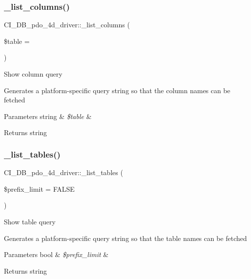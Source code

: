 \subsubsection{\texorpdfstring{\+\_\+list\+\_\+columns()}{\_list\_columns()}}
{\footnotesize\ttfamily C\+I\+\_\+\+D\+B\+\_\+pdo\+\_\+4d\+\_\+driver\+::\+\_\+list\+\_\+columns (\begin{DoxyParamCaption}\item[{}]{\$table = {\ttfamily \textquotesingle{}\textquotesingle{}} }\end{DoxyParamCaption})\hspace{0.3cm}{\ttfamily [protected]}}

Show column query

Generates a platform-\/specific query string so that the column names can be fetched


\begin{DoxyParams}[1]{Parameters}
string & {\em \$table} & \\
\hline
\end{DoxyParams}
\begin{DoxyReturn}{Returns}
string 
\end{DoxyReturn}
\mbox{\label{class_c_i___d_b__pdo__4d__driver_ad591ef8fff2b28c7c966d8cadd12ad5d}} 
\subsubsection{\texorpdfstring{\+\_\+list\+\_\+tables()}{\_list\_tables()}}
{\footnotesize\ttfamily C\+I\+\_\+\+D\+B\+\_\+pdo\+\_\+4d\+\_\+driver\+::\+\_\+list\+\_\+tables (\begin{DoxyParamCaption}\item[{}]{\$prefix\+\_\+limit = {\ttfamily FALSE} }\end{DoxyParamCaption})\hspace{0.3cm}{\ttfamily [protected]}}

Show table query

Generates a platform-\/specific query string so that the table names can be fetched


\begin{DoxyParams}[1]{Parameters}
bool & {\em \$prefix\+\_\+limit} & \\
\hline
\end{DoxyParams}
\begin{DoxyReturn}{Returns}
string 
\end{DoxyReturn}
\mbox{\label{class_c_i___d_b__pdo__4d__driver_a151a5db84417c97c3daa353d4a5e73b8}} 
